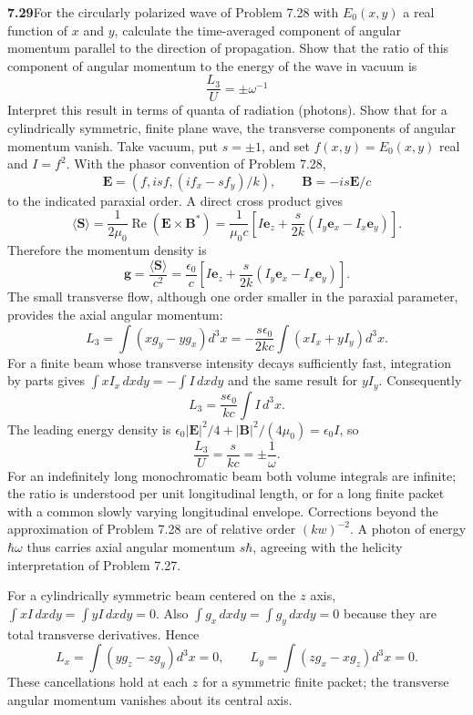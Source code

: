 \par\bigskip
\noindent\textbf{7.29}\quad For the circularly polarized wave of Problem 7.28 with $E_{0}(x,y)$ a real function of $x$ and $y$, calculate the time-averaged component of angular momentum parallel to the direction of propagation. Show that the ratio of this component of angular momentum to the energy of the wave in vacuum is
\[
\frac{L_{3}}{U}=\pm\omega^{-1}
\]
Interpret this result in terms of quanta of radiation (photons). Show that for a cylindrically symmetric, finite plane wave, the transverse components of angular momentum vanish.
\solution
Take vacuum, put $s=\pm1$, and set $f(x,y)=E_0(x,y)$ real and
$I=f^2$. With the phasor convention of Problem 7.28,
\[
\mathbf E=(f,isf,(if_x-sf_y)/k),\qquad
\mathbf B=-is\mathbf E/c
\]
to the indicated paraxial order. A direct cross product gives
\[
\langle\mathbf S\rangle=\frac1{2\mu_0}
\operatorname{Re}(\mathbf E\times\mathbf B^*)
=\frac1{\mu_0c}\left[I\mathbf e_z+
\frac{s}{2k}(I_y\mathbf e_x-I_x\mathbf e_y)\right].
\]
Therefore the momentum density is
\[
\mathbf g=\frac{\langle\mathbf S\rangle}{c^2}
=\frac{\epsilon_0}c\left[I\mathbf e_z+
\frac{s}{2k}(I_y\mathbf e_x-I_x\mathbf e_y)\right].
\]
The small transverse flow, although one order smaller in the
paraxial parameter, provides the axial angular momentum:
\[
L_3=\int(xg_y-yg_x)d^3x
=-\frac{s\epsilon_0}{2kc}\int(xI_x+yI_y)d^3x.
\]
For a finite beam whose transverse intensity decays sufficiently
fast, integration by parts gives
$\int xI_x\,dxdy=-\int I\,dxdy$ and the same result for $yI_y$.
Consequently
\[
L_3=\frac{s\epsilon_0}{kc}\int I\,d^3x.
\]
The leading energy density is
$\epsilon_0|\mathbf E|^2/4+|\mathbf B|^2/(4\mu_0)=\epsilon_0I$,
so
\[
\boxed{\frac{L_3}{U}=\frac{s}{kc}=\pm\frac1\omega.}
\]
For an indefinitely long monochromatic beam both volume integrals
are infinite; the ratio is understood per unit longitudinal length,
or for a long finite packet with a common slowly varying longitudinal
envelope. Corrections beyond the approximation of Problem 7.28 are
of relative order $(kw)^{-2}$.
A photon of energy $\hbar\omega$ thus carries axial angular momentum
$s\hbar$, agreeing with the helicity interpretation of Problem 7.27.

For a cylindrically symmetric beam centered on the $z$ axis,
$\int xI\,dxdy=\int yI\,dxdy=0$. Also
$\int g_x\,dxdy=\int g_y\,dxdy=0$ because they are total transverse
derivatives. Hence
\[
L_x=\int(yg_z-zg_y)d^3x=0,\qquad
L_y=\int(zg_x-xg_z)d^3x=0.
\]
These cancellations hold at each $z$ for a symmetric finite packet;
the transverse angular momentum vanishes about its central axis.

